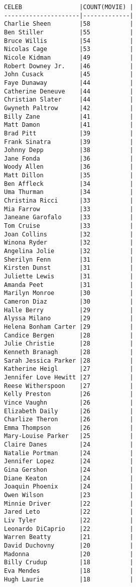 \documentclass{article}
\begin{document}
        \begin{verbatim}
CELEB                |COUNT(MOVIE) |
---------------------|-------------|
Charlie Sheen        |58           |
Ben Stiller          |55           |
Bruce Willis         |54           |
Nicolas Cage         |53           |
Nicole Kidman        |49           |
Robert Downey Jr.    |46           |
John Cusack          |45           |
Faye Dunaway         |44           |
Catherine Deneuve    |44           |
Christian Slater     |44           |
Gwyneth Paltrow      |42           |
Billy Zane           |41           |
Matt Damon           |41           |
Brad Pitt            |39           |
Frank Sinatra        |39           |
Johnny Depp          |38           |
Jane Fonda           |36           |
Woody Allen          |36           |
Matt Dillon          |35           |
Ben Affleck          |34           |
Uma Thurman          |34           |
Christina Ricci      |33           |
Mia Farrow           |33           |
Janeane Garofalo     |33           |
Tom Cruise           |33           |
Joan Collins         |32           |
Winona Ryder         |32           |
Angelina Jolie       |32           |
Sherilyn Fenn        |31           |
Kirsten Dunst        |31           |
Juliette Lewis       |31           |
Amanda Peet          |31           |
Marilyn Monroe       |30           |
Cameron Diaz         |30           |
Halle Berry          |29           |
Alyssa Milano        |29           |
Helena Bonham Carter |29           |
Candice Bergen       |28           |
Julie Christie       |28           |
Kenneth Branagh      |28           |
Sarah Jessica Parker |28           |
Katherine Heigl      |27           |
Jennifer Love Hewitt |27           |
Reese Witherspoon    |27           |
Kelly Preston        |26           |
Vince Vaughn         |26           |
Elizabeth Daily      |26           |
Charlize Theron      |26           |
Emma Thompson        |26           |
Mary-Louise Parker   |25           |
Claire Danes         |24           |
Natalie Portman      |24           |
Jennifer Lopez       |24           |
Gina Gershon         |24           |
Diane Keaton         |24           |
Joaquin Phoenix      |24           |
Owen Wilson          |23           |
Minnie Driver        |22           |
Jared Leto           |22           |
Liv Tyler            |22           |
Leonardo DiCaprio    |22           |
Warren Beatty        |21           |
David Duchovny       |20           |
Madonna              |20           |
Billy Crudup         |18           |
Eva Mendes           |18           |
Hugh Laurie          |18           |

\end{verbatim}
\end{document}

